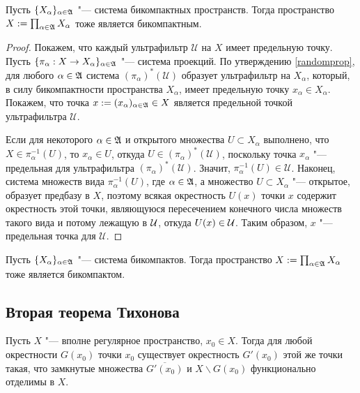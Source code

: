 \begin{theorem}
    Пусть $\lbrace X_{\alpha}\rbrace_{\alpha \in \mathfrak A}$ "--- система бикомпактных пространств. Тогда пространство $X := \prod_{\alpha \in \mathfrak A}X_{\alpha}$ тоже является бикомпактным.
\end{theorem}

\begin{proof}
    Покажем, что каждый ультрафильтр $\mathcal{U}$ на $X$ имеет предельную точку. Пусть $\{\pi_{\alpha}: X \rightarrow X_{\alpha}\}_{\alpha \in \mathfrak A}$ "--- система проекций. По утверждению \ref{randomprop}, для любого $\alpha \in \mathfrak A$ система $(\pi_{\alpha})^*(\mathcal{U})$ образует ультрафильтр на $X_{\alpha}$, который, в силу бикомпактности пространства $X_{\alpha}$, имеет предельную точку $x_{\alpha} \in X_\alpha$. Покажем, что точка $x := (x_{\alpha})_{\alpha \in \mathfrak A} \in X$ является предельной точкой ультрафильтра $\mathcal{U}$.
    
    Если для некоторого $\alpha \in \mathfrak A$ и открытого множества $U \subset X_\alpha$ выполнено, что $X \in \pi_{\alpha}^{-1}(U)$, то $x_{\alpha} \in U$, откуда $U \in (\pi_{\alpha})^*(\mathcal{U})$, поскольку точка $x_\alpha$ "--- предельная для ультрафильтра $(\pi_{\alpha})^*(\mathcal{U})$. Значит, $\pi_{\alpha}^{-1}(U) \in \mathcal{U}$. Наконец, система множеств вида $\pi_{\alpha}^{-1}(U)$, где $\alpha \in \mathfrak A$, а множество $U \subset X_\alpha$ "--- открытое, образует предбазу в $X$, поэтому всякая окрестность $U(x)$ точки $x$ содержит окрестность этой точки, являющуюся пересечением конечного числа множеств такого вида и потому лежащую в $\mathcal U$, откуда $U(x) \in \mathcal U$. Таким образом, $x$ "--- предельная точка для $\mathcal{U}$.
\end{proof}

\begin{corollary}
    Пусть $\lbrace X_{\alpha}\rbrace_{\alpha \in \mathfrak A}$ "--- система бикомпактов. Тогда пространство $X := \prod_{\alpha \in \mathfrak A}X_{\alpha}$ тоже является бикомпактом.
\end{corollary}

\subsection{Вторая теорема Тихонова}

\begin{proposition}
    Пусть $X$ "--- вполне регулярное пространство, $x_0 \in X$. Тогда для любой окрестности $G(x_0)$ точки $x_0$ существует окрестность $G'(x_0)$ этой же точки такая, что замкнутые множества $\overline{G'(x_0)}$ и $X \backslash G(x_0)$ функционально отделимы в $X$.
\end{proposition}

